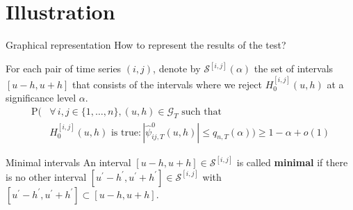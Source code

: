 \documentclass[10pt]{beamer}
\newcommand{\Prob}{\mathrm{P}}
\begin{document}
\section{Illustration}

\begin{frame}{Graphical representation}
How to represent the results of the test? \pause

For each pair of time series $(i, j)$, denote by $\mathcal{S}^{[i, j]}(\alpha)$ the set of intervals $[u-h, u+h]$ that consists of the intervals where we reject $H_0^{[i,j]}(u,h)$ at a significance level $\alpha$.\pause
\begin{align*}\Prob\Big(& \forall \, i,j \in \{1, \ldots, n\}, (u, h) \in \mathcal{G}_T \text{ such that }\\
&H_0^{[i, j]}(u, h) \text{ is true}: |\hat{\psi}^0_{ij,T}(u, h)| \le q_{n,T}(\alpha) \Big) \ge 1 - \alpha + o(1)
\end{align*}
\pause
\vspace{-3mm}
\begin{block}{Minimal intervals}
An interval $[u-h, u+h] \in \mathcal{S}^{[i, j]}$ is called \textbf{minimal} if there is no other interval $[u^\prime-h^\prime, u^\prime+h^\prime] \in  \mathcal{S}^{[i, j]}$ with $[u^\prime-h^\prime, u^\prime+h^\prime] \subset [u-h, u+h]$.
\end{block}
\end{frame}
\end{document}
